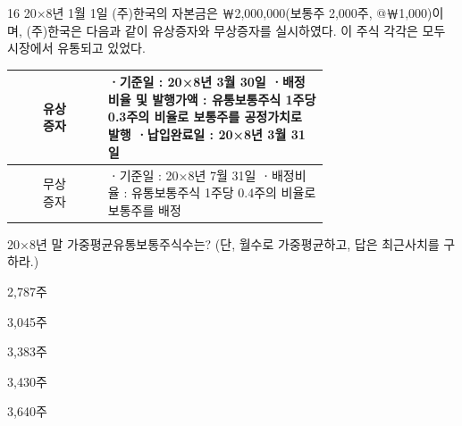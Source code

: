 \begin{question}{16}
20×8년 1월 1일 (주)한국의 자본금은 ￦2,000,000(보통주 2,000주, @￦1,000)이며, (주)한국은 다음과 같이 유상증자와 무상증자를 실시하였다. 이 주식 각각은 모두 시장에서 유통되고 있었다.

{\small\centering
\begin{tabular}{|c|p{0.7\linewidth}|}
\hline
\makecell{유상\\증자} & ㆍ기준일 : 20×8년 3월 30일 \newline ㆍ배정비율 및 발행가액 : 유통보통주식 1주당 0.3주의 비율로 보통주를 공정가치로 발행 \newline ㆍ납입완료일 : 20×8년 3월 31일 \\
\hline
\makecell{무상\\증자} & ㆍ기준일 : 20×8년 7월 31일 \newline ㆍ배정비율 : 유통보통주식 1주당 0.4주의 비율로 보통주를 배정 \\
\hline
\end{tabular}\par}

20×8년 말 가중평균유통보통주식수는? (단, 월수로 가중평균하고, 답은 최근사치를 구하라.)
\begin{choices}
  \item 2,787주
  \item 3,045주
  \item 3,383주
  \item 3,430주
  \item 3,640주
\end{choices}
\end{question}
